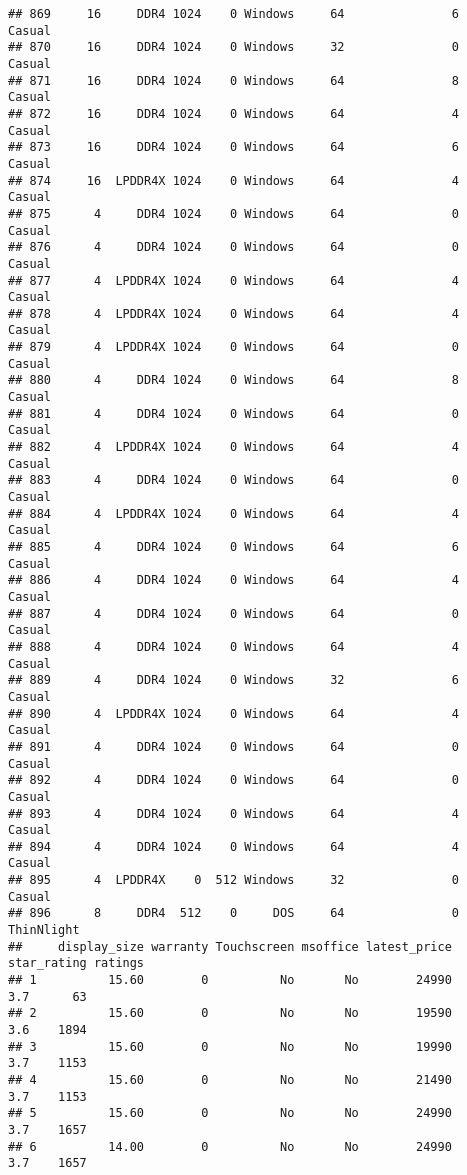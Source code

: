 \documentclass[
]{article}
\begin{document}
\begin{verbatim}
## 869     16     DDR4 1024    0 Windows     64               6     Casual
## 870     16     DDR4 1024    0 Windows     32               0     Casual
## 871     16     DDR4 1024    0 Windows     64               8     Casual
## 872     16     DDR4 1024    0 Windows     64               4     Casual
## 873     16     DDR4 1024    0 Windows     64               6     Casual
## 874     16  LPDDR4X 1024    0 Windows     64               4     Casual
## 875      4     DDR4 1024    0 Windows     64               0     Casual
## 876      4     DDR4 1024    0 Windows     64               0     Casual
## 877      4  LPDDR4X 1024    0 Windows     64               4     Casual
## 878      4  LPDDR4X 1024    0 Windows     64               4     Casual
## 879      4  LPDDR4X 1024    0 Windows     64               0     Casual
## 880      4     DDR4 1024    0 Windows     64               8     Casual
## 881      4     DDR4 1024    0 Windows     64               0     Casual
## 882      4  LPDDR4X 1024    0 Windows     64               4     Casual
## 883      4     DDR4 1024    0 Windows     64               0     Casual
## 884      4  LPDDR4X 1024    0 Windows     64               4     Casual
## 885      4     DDR4 1024    0 Windows     64               6     Casual
## 886      4     DDR4 1024    0 Windows     64               4     Casual
## 887      4     DDR4 1024    0 Windows     64               0     Casual
## 888      4     DDR4 1024    0 Windows     64               4     Casual
## 889      4     DDR4 1024    0 Windows     32               6     Casual
## 890      4  LPDDR4X 1024    0 Windows     64               4     Casual
## 891      4     DDR4 1024    0 Windows     64               0     Casual
## 892      4     DDR4 1024    0 Windows     64               0     Casual
## 893      4     DDR4 1024    0 Windows     64               4     Casual
## 894      4     DDR4 1024    0 Windows     64               4     Casual
## 895      4  LPDDR4X    0  512 Windows     32               0     Casual
## 896      8     DDR4  512    0     DOS     64               0 ThinNlight
##     display_size warranty Touchscreen msoffice latest_price star_rating ratings
## 1          15.60        0          No       No        24990         3.7      63
## 2          15.60        0          No       No        19590         3.6    1894
## 3          15.60        0          No       No        19990         3.7    1153
## 4          15.60        0          No       No        21490         3.7    1153
## 5          15.60        0          No       No        24990         3.7    1657
## 6          14.00        0          No       No        24990         3.7    1657

\end{verbatim}
\end{document}
